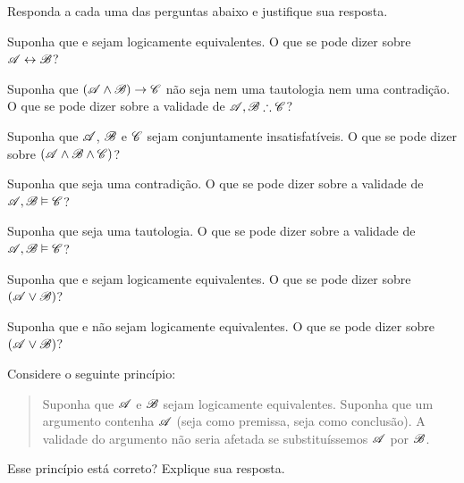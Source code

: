 \solutions
\problempart
\label{pr.TT.concepts}
Responda a cada uma das perguntas abaixo e justifique sua resposta.
\begin{compactlist}
\item Suponha que  e  sejam logicamente equivalentes. O que se pode dizer sobre $\mathscr{A}\leftrightarrow\mathscr{B}$?
\item Suponha que $(\mathscr{A}\wedge\mathscr{B})\rightarrow\mathscr{C}$ não seja nem uma tautologia nem uma contradição. O que se pode dizer sobre a validade de $\metav{A}, \metav{B} \therefore\metav{C}$?
\item Suponha que $\mathscr{A}$, $\mathscr{B}$ e $\mathscr{C}$  sejam conjuntamente insatisfatíveis. O que se pode dizer sobre $(\mathscr{A}\wedge\mathscr{B}\wedge\mathscr{C})$?
\item Suponha que  seja uma contradição. O que se pode dizer sobre a validade de $\mathscr{A}, \mathscr{B} \vDash \mathscr{C}$?
\item Suponha que  seja uma tautologia. O que se pode dizer sobre a validade de $\mathscr{A}, \mathscr{B}\vDash \mathscr{C}$?
\item Suponha que  e  sejam logicamente equivalentes. O que se pode dizer sobre $(\mathscr{A}\vee\mathscr{B})$?
\item Suponha que  e  não sejam logicamente equivalentes. O que se pode dizer sobre $(\mathscr{A}\vee\mathscr{B})$?
\end{compactlist}
\problempart 
Considere o seguinte princípio:
	\begin{quote}
		Suponha que $\mathscr{A}$ e $\mathscr{B}$ sejam logicamente equivalentes. Suponha que um argumento contenha $\mathscr{A}$ (seja como premissa, seja como conclusão). A validade do argumento não seria afetada se substituíssemos $\mathscr{A}$ por $\mathscr{B}$.
	\end{quote}
Esse princípio está correto? Explique sua resposta.

